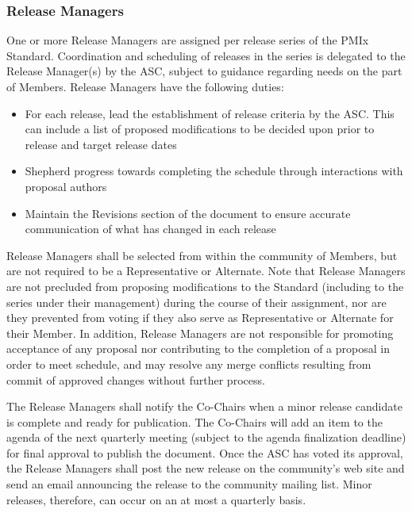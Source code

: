 \documentclass{article}
\providecommand{\tightlist}{%
  \setlength{\itemsep}{0pt}\setlength{\parskip}{0pt}}
\begin{document}
\hypertarget{release-managers}{%
\subsubsection{Release Managers}%
\label{release-managers}}

One or more Release Managers are assigned per release series of the PMIx
Standard. Coordination and scheduling of releases in the series is
delegated to the Release Manager(s) by the ASC, subject to guidance
regarding needs on the part of Members. Release Managers have the
following duties:

\begin{itemize}
\tightlist
\item
  For each release, lead the establishment of release criteria by the
  ASC. This can include a list of proposed modifications to be decided
  upon prior to release and target release dates
\item
  Shepherd progress towards completing the schedule through interactions
  with proposal authors
\item
  Maintain the Revisions section of the document to ensure accurate
  communication of what has changed in each release
\end{itemize}

Release Managers shall be selected from within the community of Members,
but are not required to be a Representative or Alternate. Note that
Release Managers are not precluded from proposing modifications to the
Standard (including to the series under their management) during the
course of their assignment, nor are they prevented from voting if they
also serve as Representative or Alternate for their Member. In addition,
Release Managers are not responsible for promoting acceptance of any
proposal nor contributing to the completion of a proposal in order to
meet schedule, and may resolve any merge conflicts resulting from commit
of approved changes without further process.

The Release Managers shall notify the Co-Chairs when a minor release
candidate is complete and ready for publication. The Co-Chairs will add
an item to the agenda of the next quarterly meeting (subject to the
agenda finalization deadline) for final approval to publish the document. Once the ASC
has voted its approval, the Release Managers shall post the new release
on the community's web site and send an email announcing the release to
the community mailing list. Minor releases, therefore, can occur on an
at most a quarterly basis.
\end{document}

